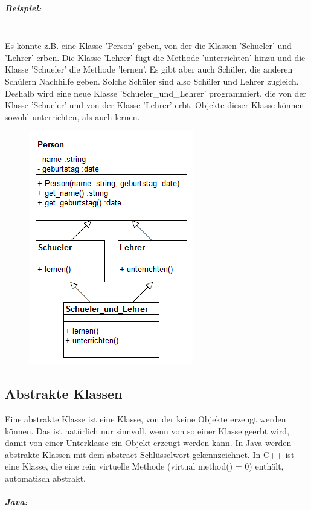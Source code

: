 				\subparagraph*{Beispiel:}\mbox{}\\
					Es könnte z.B. eine Klasse 'Person' geben, von der die Klassen 'Schueler' und 'Lehrer' erben. Die Klasse
					'Lehrer' fügt die Methode 'unterrichten' hinzu und die Klasse 'Schueler' die Methode 'lernen'. Es gibt aber
					auch Schüler, die anderen Schülern Nachhilfe geben. Solche Schüler sind also Schüler und Lehrer zugleich.
					Deshalb wird eine neue Klasse 'Schueler\_und\_Lehrer' programmiert, die von der Klasse 'Schueler' und von
					der Klasse 'Lehrer' erbt. Objekte dieser Klasse können sowohl unterrichten, als auch lernen.
					\begin{figure}[H]
						\includegraphics[scale=0.75]{vererbung/mehrfach/diamond/beispiele/schueler_lehrer/schueler_lehrer.png}
					\end{figure}
				
			
			
	\subsection{Abstrakte Klassen}
		Eine abstrakte Klasse ist eine Klasse, von der keine Objekte erzeugt werden können. Das ist natürlich nur sinnvoll,
		wenn von so einer Klasse geerbt wird, damit von einer Unterklasse ein Objekt erzeugt werden kann. In Java werden
		abstrakte Klassen mit dem abstract-Schlüsselwort gekennzeichnet. In C++ ist eine Klasse, die eine rein virtuelle
		Methode (virtual method() = 0) enthält, automatisch abstrakt.
		
		\subparagraph*{Java:}\mbox{}\\
			\UseRawInputEncoding{}
		
